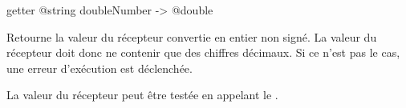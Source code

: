 
\begin{galgas4box}
getter @string doubleNumber -> @double
\end{galgas4box}

Retourne la valeur du récepteur convertie en entier non signé. La valeur du récepteur doit donc ne contenir que des chiffres décimaux. Si ce n'est pas le cas, une erreur d'exécution est déclenchée.

La valeur du récepteur peut être testée en appelant le .

%





